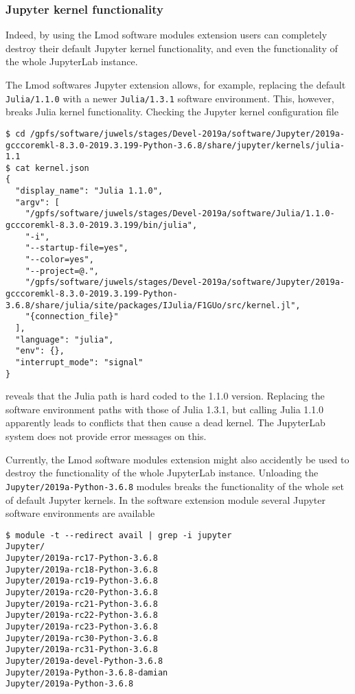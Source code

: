 \documentclass[11pt,a4paper]{article}
\begin{document}
\subsubsection{Jupyter kernel functionality}

Indeed, by using the Lmod software modules extension users can completely destroy their default Jupyter kernel functionality, and even the functionality of the whole JupyterLab instance.

The Lmod softwares Jupyter extension allows, for example, replacing the default \verb|Julia/1.1.0| with a newer \verb|Julia/1.3.1| software environment.
This, however, breaks Julia kernel functionality.
Checking the Jupyter kernel configuration file

\begin{verbatim}
$ cd /gpfs/software/juwels/stages/Devel-2019a/software/Jupyter/2019a-gcccoremkl-8.3.0-2019.3.199-Python-3.6.8/share/jupyter/kernels/julia-1.1
$ cat kernel.json
{
  "display_name": "Julia 1.1.0",
  "argv": [
    "/gpfs/software/juwels/stages/Devel-2019a/software/Julia/1.1.0-gcccoremkl-8.3.0-2019.3.199/bin/julia",
    "-i",
    "--startup-file=yes",
    "--color=yes",
    "--project=@.",
    "/gpfs/software/juwels/stages/Devel-2019a/software/Jupyter/2019a-gcccoremkl-8.3.0-2019.3.199-Python-3.6.8/share/julia/site/packages/IJulia/F1GUo/src/kernel.jl",
    "{connection_file}"
  ],
  "language": "julia",
  "env": {},
  "interrupt_mode": "signal"
}
\end{verbatim}

reveals that the Julia path is hard coded to the 1.1.0 version.
Replacing the software environment paths with those of Julia 1.3.1, but calling Julia 1.1.0 apparently leads to conflicts that then cause a dead kernel.
The JupyterLab system does not provide error messages on this.

Currently, the Lmod software modules extension might also accidently be used to destroy the functionality of the whole JupyterLab instance.
Unloading the \verb|Jupyter/2019a-Python-3.6.8| modules breaks the functionality of the whole set of default Jupyter kernels.
In the software extension module several Jupyter software environments are available

\begin{verbatim}
$ module -t --redirect avail | grep -i jupyter
Jupyter/
Jupyter/2019a-rc17-Python-3.6.8
Jupyter/2019a-rc18-Python-3.6.8
Jupyter/2019a-rc19-Python-3.6.8
Jupyter/2019a-rc20-Python-3.6.8
Jupyter/2019a-rc21-Python-3.6.8
Jupyter/2019a-rc22-Python-3.6.8
Jupyter/2019a-rc23-Python-3.6.8
Jupyter/2019a-rc30-Python-3.6.8
Jupyter/2019a-rc31-Python-3.6.8
Jupyter/2019a-devel-Python-3.6.8
Jupyter/2019a-Python-3.6.8-damian
Jupyter/2019a-Python-3.6.8
\end{verbatim}
\end{document}
